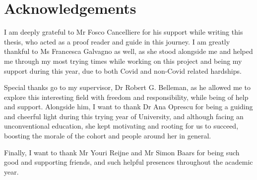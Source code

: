 \chapter*{Acknowledgements}

I am deeply grateful to Mr Fosco Cancelliere for his support while writing this thesis, who acted as a proof reader and guide in this journey. I am greatly thankful to Ms Francesca Galvagno as well, as she stood alongside me and helped me through my most trying times while working on this project and being my support during this year, due to both Covid and non-Covid related hardships.

Special thanks go to my supervisor, Dr Robert G. Belleman, as he allowed me to explore this interesting field with freedom and responsibility, while being of help and support. Alongside him, I want to thank Dr Ana Oprescu for being a guiding and cheerful light during this trying year of University, and although facing an unconventional education, she kept motivating and rooting for us to succeed, boosting the morale of the cohort and people around her in general.

Finally, I want to thank Mr Youri Reijne and Mr Simon Baars for being such good and supporting friends, and such helpful presences throughout the academic year.